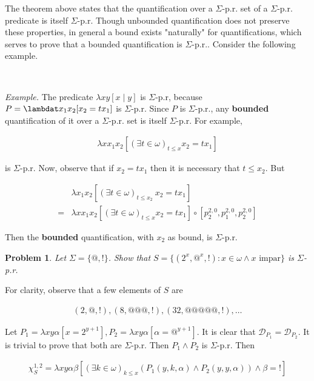 \documentclass[a4paper, 12pt]{article}
\newtheorem{problem}{Problem}
\newtheorem{problem}{Problem}
\begin{document}
   
The theorem above states that the quantification over a $\Sigma$-p.r. set of a
$\Sigma$-p.r. predicate is itself $\Sigma$-p.r. Though unbounded quantification
does not preserve these properties, in general a bound exists "naturally" for
quantifications, which serves to prove that a bounded quantification is
$\Sigma$-p.r.. Consider the following example.

~

\textit{Example.} The predicate $\lambda xy[x \mid y]$ is $\Sigma$-p.r, because
$P = \lambdat x_1 x_2 [x_2 = tx_1]$ is $\Sigma$-p.r. Since $P$ is $\Sigma$-p.r.,
any \textbf{bounded} quantification of it over a $\Sigma$-p.r. set is itself
$\Sigma$-p.r. For example, 

\begin{align*}
    \lambda x x_1 x_2 \left[(\exists t \in \omega)_{t \leq x} x_2 = tx_1\right]
\end{align*}

is $\Sigma$-p.r. Now, observe that if $x_2 = tx_1$ then it is necessary that $t
\leq x_2$. But 

\begin{align*}
    &\lambda x_1 x_2 \left[(\exists t \in \omega)_{t \leq x_2} ~  x_2 =
tx_1\right] \\ = 
    &\lambda x x_1 x_2 \left[(\exists t \in \omega)_{t \leq x} x_2 = tx_1\right]
    \circ \left[ p_{2}^{2, 0}, p_1^{2, 0}, p_2^{2, 0} \right] 
\end{align*}

Then the \textbf{bounded} quantification, with $x_2$ as bound, is $\Sigma$-p.r.


\begin{problem}
    Let $\Sigma = \{@, !\}$. Show that $S = \{(2^x, @^x, !) : x \in \omega \land x \text{ impar}\}$ is $\Sigma$-p.r.
\end{problem}

For clarity, observe that a few elements of
$S$ are 

\begin{align*}
    (2, @, !), (8, @@@, !), (32, @@@@@, !), \ldots
\end{align*}


Let $P_1 = \lambda xy\alpha \left[ x = 2^{y +1} \right], P_2 =
\lambda xy\alpha[\alpha = @^{y + 1}] $. It is clear that $\mathcal{D}_{P_1} =
\mathcal{D}_{P_2}$. It is trivial to prove that both are $\Sigma$-p.r. Then $P_1
\land P_2$ is $\Sigma$-p.r. Then

\begin{align*}
    \chi_{S}^{1, 2} = \lambda xy \alpha \beta \left[ (\exists k \in \omega)_{k \leq
        x} \left( P_1(y, k, \alpha) \land P_2(y, y, \alpha)\right) 
 \land \beta = !  \right] 
\end{align*}
\end{document}
